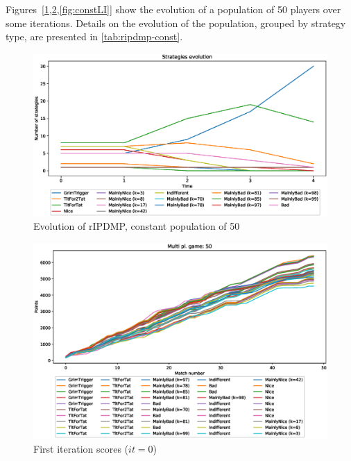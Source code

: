 \documentclass[journal,10pt,twoside]{IEEEtran}
\begin{document}
Figures~[\ref{fig:constR},\ref{fig:constFI},\ref{fig:constLI}] show the evolution of a population of 50 players over some iterations.
Details on the evolution of the population, grouped by strategy type, are presented in \autoref{tab:ripdmp-const}.

\begin{figure}[!ht]
    \centering
    \includegraphics[width=1\columnwidth]{../img/ripdmp-const/ripdmp-evolution-const-pop-50}
    \caption{Evolution of rIPDMP, constant population of 50}
    \label{fig:constR}
\end{figure}

\begin{figure}[!ht]
    \centering
    \includegraphics[width=1\columnwidth]{../img/ripdmp-const/ripdmp-scores-const-pop-50-r0}
    \caption{First iteration scores ($it=0$)}
    \label{fig:constFI}
\end{figure}
\end{document}
